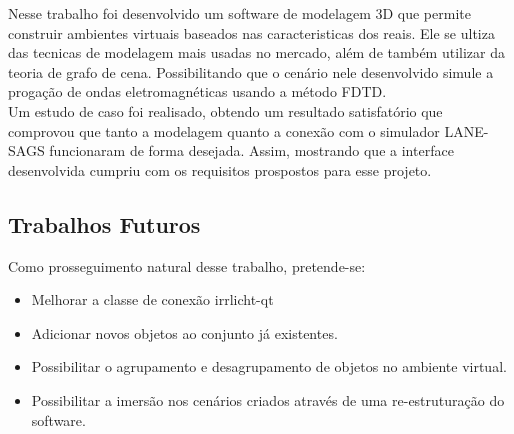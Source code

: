 Nesse trabalho foi desenvolvido um software de modelagem 3D que permite construir ambientes virtuais baseados nas caracteristicas dos reais. Ele se ultiza das tecnicas de modelagem mais usadas no mercado, além de também utilizar da teoria de grafo de cena. Possibilitando que o cenário nele desenvolvido simule a progação de ondas eletromagnéticas usando a método FDTD.\\

Um estudo de caso foi realisado, obtendo um resultado satisfatório que comprovou que tanto a modelagem quanto a conexão com o simulador LANE-SAGS funcionaram de forma desejada. Assim, mostrando que a interface desenvolvida cumpriu com os requisitos prospostos para esse projeto.

\subsection{Trabalhos Futuros}
Como prosseguimento natural desse trabalho, pretende-se:
\begin{itemize}
	\item{Melhorar a classe de conexão irrlicht-qt}
	\item{Adicionar novos objetos ao conjunto já existentes.}
	\item{Possibilitar o agrupamento e desagrupamento de objetos no ambiente virtual.}
	\item{Possibilitar a imersão nos cenários criados através de uma re-estruturação do software.}

\end{itemize}
